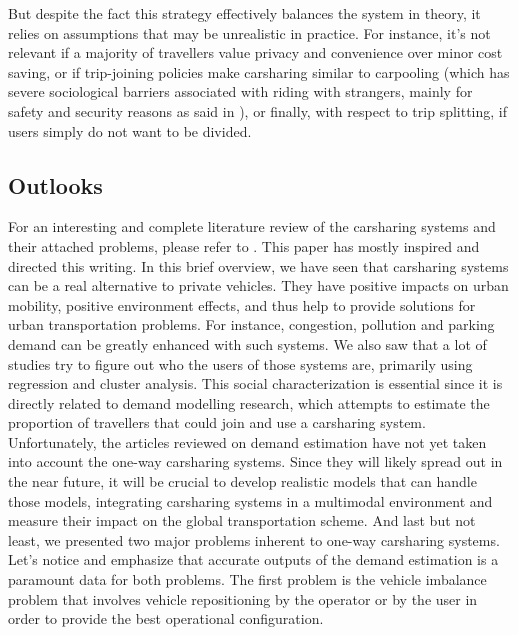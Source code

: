 \begin{bibunit}[ieeetr]
But despite the fact this strategy effectively balances the system in theory, it relies on assumptions that may be unrealistic in practice.
For instance, it's not relevant if a majority of travellers value privacy and convenience over minor cost saving, or if trip-joining policies make carsharing similar to carpooling (which has severe sociological barriers associated with riding with strangers, mainly for safety and security reasons as said in \cite{chan_ridesharing_2012, correia_carpooling_2011}), or finally, with respect to trip splitting, if users simply do not want to be divided.

\subsection{Outlooks}

For an interesting and complete literature review of the carsharing systems and their attached problems, please refer to \cite{jorge_carsharing_2013}.
This paper has mostly inspired and directed this writing.
In this brief overview, we have seen that carsharing systems can be a real alternative to private vehicles.
They have positive impacts on urban mobility, positive environment effects, and thus help to provide solutions for urban transportation problems.
For instance, congestion, pollution and parking demand can be greatly enhanced with such systems.
We also saw that a lot of studies try to figure out who the users of those systems are, primarily
using regression and cluster analysis.
This social characterization is essential since it is directly related to demand modelling research, which attempts to estimate the proportion of
travellers that could join and use a carsharing system.
Unfortunately, the articles reviewed on demand estimation have not yet taken into account the one-way carsharing systems.
Since they will likely spread out in the near future, it will be crucial to develop realistic models that can handle those models, integrating carsharing systems in a multimodal environment and measure their impact on the global transportation scheme.
And last but not least, we presented two major problems inherent to one-way carsharing systems.
Let's notice and emphasize that accurate outputs of the demand estimation is a paramount data for both problems.
The first problem is the vehicle imbalance problem that involves vehicle repositioning by the operator or by the user in order to provide the best operational configuration.


\end{bibunit}
